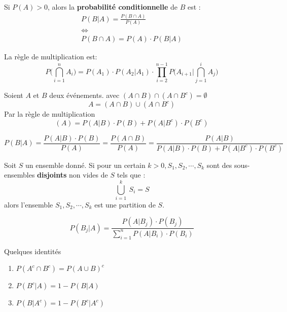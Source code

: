 	\begin{mydef}
		Si $P(A)>0$, alors la \textbf{probabilité conditionnelle} de $B$ est :
		\begin{gather}
			P(B|A)=\frac{P(B\cap A)}{P(A)}\label{eq:prodcond1}\\ \Longleftrightarrow\nonumber\\ P(B\cap A) =P(A)\cdot P(B|A)\label{eq:prodcond2} 
		\end{gather}%
		\begin{remark} La règle de multiplication est:
			\begin{equation}
			 P\bigg(\bigcap_{i=1}^n A_i\bigg)= P(A_1)\cdot P(A_2|A_1)\cdot\prod_{i=2}^{n-1}P\bigg(A_{i+1}\Big\lvert\bigcap_{j=1}^{i}A_j\bigg)
			\end{equation}%
		\end{remark}%
	\end{mydef}%
	\begin{mydef}
		Soient $A$ et $B$ deux événements. avec $(A\cap B)\cap(A\cap B^c)=\emptyset$
		\begin{equation}\label{eq:probtot}
			A=(A\cap B)\cup(A\cap B^c)
		\end{equation}
		Par la règle de multiplication
		\begin{equation}
			(A)=P(A|B)\cdot P(B) + P(A|B^c)\cdot P(B^c)
		\end{equation}
	\end{mydef}
	\begin{mydef}
		\begin{equation}\label{eq:bayes}
			P(B|A)=\frac{P(A|B)\cdot P(B)}{P(A)}=\frac{P(A\cap B)}{P(A)}=\frac{P(A|B)}{P(A|B)\cdot P(B) + P(A|B^c)\cdot P(B^c)}
		\end{equation}%
	\end{mydef}%
	\begin{mydef}[Partition]
		Soit $S$ un ensemble donné. Si pour un certain $k>0, S_1, S_2,\cdots, S_k$ sont des sous-ensembles \textbf{disjoints} non vides de $S$ tels que :
		\[\bigcup_{i=1}^k~S_i = S\]
		alors l'ensemble ${S_1,S_2,\cdots, S_k}$ est une partition de $S$.
	\end{mydef}
	\begin{mythm}
		\begin{equation}\label{eq:bayesgen}
			P(B_j|A)=\frac{P(A|B_j)\cdot P(B_j)}{\sum_{i=1}^{n} P(A|B_i)\cdot P(B_i)}
		\end{equation}%
	\end{mythm}%
	Quelques identités
	\begin{enumerate}
		\item \(P(A^c \cap B^c) = P(A\cup B)^c\)
		\item \(P(B^c|A)= 1-P(B|A)\)
		\item \(P(B|A^c)= 1-P(B^c|A^c)\)
	\end{enumerate}

